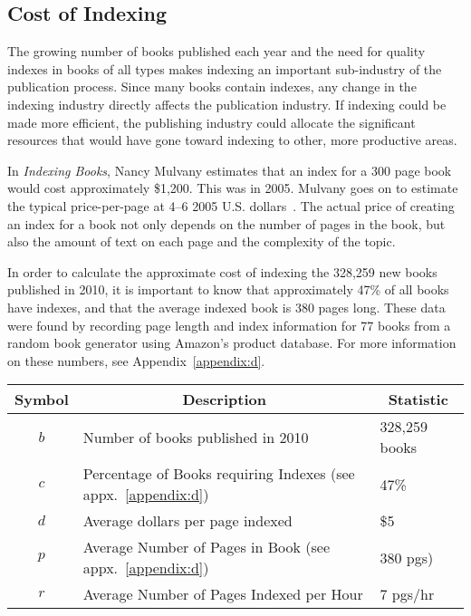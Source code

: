 \subsection{Cost of Indexing}

The growing number of books published each year and the need for quality indexes in books of all types makes indexing an important sub-industry of the publication process.
Since many books contain indexes, any change in the indexing industry directly affects the publication industry.
If indexing could be made more efficient, the publishing industry could allocate the significant resources that would have gone toward indexing to other, more productive areas.

In {\it Indexing Books}, Nancy Mulvany estimates that an index for a 300 page book would cost approximately \$1,200.
This was in 2005.
Mulvany goes on to estimate the typical price-per-page at 4--6 2005 U.S. dollars~\cite{mulvany}.
The actual price of creating an index for a book not only depends on the number of pages in the book, but also the amount of text on each page and the complexity of the topic.

In order to calculate the approximate cost of indexing the 328,259 new books published in 2010, it is important to know that approximately 47\% of all books have indexes, and that the average indexed book is 380 pages long.
These data were found by recording page length and index information for 77 books from a random book generator using Amazon's product database. For more information on these numbers, see Appendix~\ref{appendix:d}.

\begin{center}
\begin{tabular}{|c|l|l|}
\hline
\multicolumn{1}{|c|}{{\bf Symbol}} & \multicolumn{1}{c|}{{\bf Description}} & \multicolumn{1}{c|}{{\bf Statistic}} \\
\hline
$b$ & Number of books published in 2010 \cite{bowker} & 328,259 books \\
\hline
$c$ & Percentage of Books requiring Indexes (see appx.~\ref{appendix:d}) & 47\% \\
\hline
$d$ & Average dollars per page indexed \cite{mulvany} & \$5 \\
\hline 
$p$ & Average Number of Pages in Book (see appx.~\ref{appendix:d}) & 380 pgs) \\ 
\hline 
$r$ & Average Number of Pages Indexed per Hour \cite{connolly} & 7 pgs/hr \\
\hline
\end{tabular}
\end{center}

